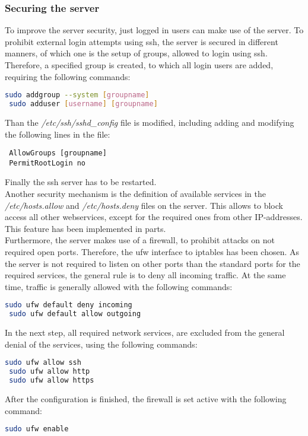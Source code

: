 \subsubsection{Securing the server}
To improve the server security, just logged in users can make use of the server. To prohibit external login attempts using ssh, the server is secured in different manners, of which 
one is the setup of groups, allowed to login using ssh. Therefore, a specified group is created, to which all login users are added, requiring the following commands:
\begin{lstlisting}[language=bash]
 sudo addgroup --system [groupname]
 sudo adduser [username] [groupname]
\end{lstlisting}
Than the \emph{/etc/ssh/sshd\_config} file is modified, including adding and modifying the following lines in the file:
\begin{lstlisting}
 AllowGroups [groupname]
 PermitRootLogin no
\end{lstlisting}
Finally the ssh server has to be restarted.\\
Another security mechanism is the definition of available services in the \emph{/etc/hosts.allow} and \emph{/etc/hosts.deny} files on the server. This allows to block access all other 
webservices, except for the required ones from other IP-addresses. This feature has been implemented in parts.\\
Furthermore, the server makes use of a firewall, to prohibit attacks on not required open ports. Therefore, the ufw interface to iptables has been chosen. As the server is not 
required to listen on other ports than the standard ports for the required services, the general rule is to deny all incoming traffic. At the same time, traffic is generally 
allowed with the following commands:
\begin{lstlisting}[language=bash]
 sudo ufw default deny incoming
 sudo ufw default allow outgoing
\end{lstlisting}
In the next step, all required network services, are excluded from the general denial of the services, using the following commands:
\begin{lstlisting}[language=bash]
 sudo ufw allow ssh
 sudo ufw allow http
 sudo ufw allow https
\end{lstlisting}
After the configuration is finished, the firewall is set active with the following command:
\begin{lstlisting}[language=bash]
 sudo ufw enable
\end{lstlisting}


